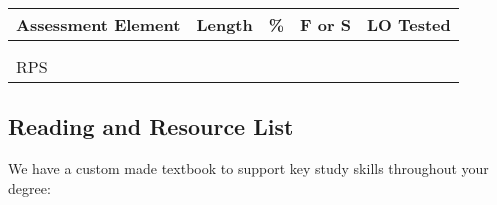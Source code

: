 \documentclass[
  11pt,
  letterpaper,
  oneside,
  open=any]{scrbook}
\begin{document}
\begin{longtable}[]{@{}lllll@{}}
\toprule()
Assessment Element & Length & \% & F or S & LO Tested \\
\midrule()
\endhead
& & & & \\
& & & & \\
RPS & & & & \\
\bottomrule()
\end{longtable}

\hypertarget{reading-and-resource-list}{%
\subsection{Reading and Resource List}\label{reading-and-resource-list}}

We have a custom made textbook to support key study skills throughout
your degree:

\newpage
\end{document}
